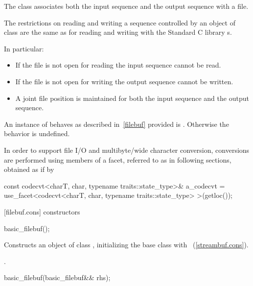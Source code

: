 \pnum
The class
associates both the input sequence and the output
sequence with a file.

\pnum
The restrictions on reading and writing a sequence controlled by an
object of class
are the same as for reading and writing with the Standard C library
s.

\pnum
In particular:
\begin{itemize}
\item
If the file is not open for reading the input sequence
cannot be read.
\item
If the file is not open for writing the output
sequence cannot be written.
\item
A joint file position is maintained for both the input sequence and
the output sequence.
\end{itemize}

\pnum
An instance of
behaves as described in~\ref{filebuf} provided
is
.
Otherwise the behavior is undefined.

\pnum
In order to support file I/O and multibyte/wide character conversion,
conversions are performed using members of a facet, referred to as
 in following sections, obtained as if by

\begin{codeblock}
const codecvt<charT, char, typename traits::state_type>& a_codecvt =
  use_facet<codecvt<charT, char, typename traits::state_type> >(getloc());
\end{codeblock}

[filebuf.cons]{ constructors}

%
\begin{itemdecl}
basic_filebuf();
\end{itemdecl}

\begin{itemdescr}
\pnum
\effects
Constructs an object of class
,
initializing the base class with
~(\ref{streambuf.cons}).

\pnum
\postcondition
{}.
\end{itemdescr}

%
\begin{itemdecl}
basic_filebuf(basic_filebuf&& rhs);
\end{itemdecl}

